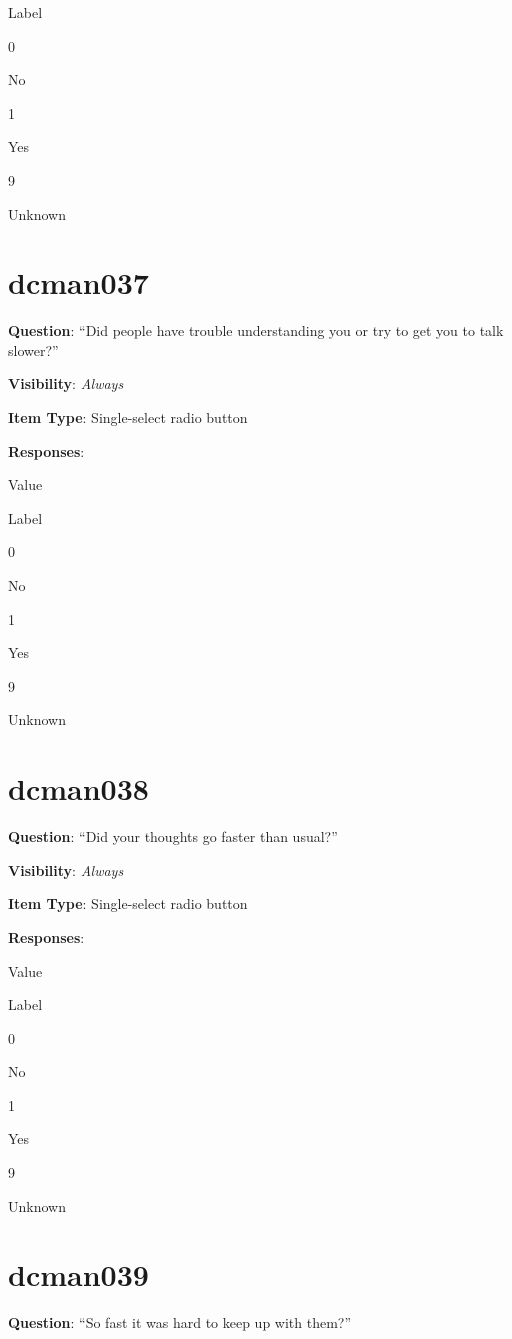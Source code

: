 \documentclass[]{book}
\begin{document}
Label

0

No

1

Yes

9

Unknown

\hypertarget{dcman037}{%
\section{dcman037}\label{dcman037}}

\textbf{Question}: ``Did people have trouble understanding you or try to get you to talk slower?''

\textbf{Visibility}: \emph{Always}

\textbf{Item Type}: Single-select radio button

\textbf{Responses}:

Value

Label

0

No

1

Yes

9

Unknown

\hypertarget{dcman038}{%
\section{dcman038}\label{dcman038}}

\textbf{Question}: ``Did your thoughts go faster than usual?''

\textbf{Visibility}: \emph{Always}

\textbf{Item Type}: Single-select radio button

\textbf{Responses}:

Value

Label

0

No

1

Yes

9

Unknown

\hypertarget{dcman039}{%
\section{dcman039}\label{dcman039}}

\textbf{Question}: ``So fast it was hard to keep up with them?''
\end{document}
